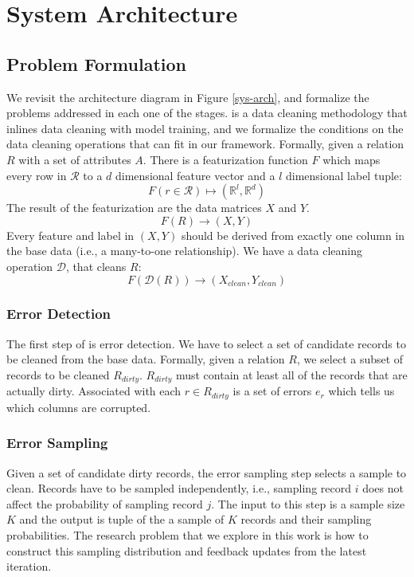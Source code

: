\section{System Architecture}\label{arch}

\subsection{Problem Formulation}
We revisit the architecture diagram in Figure \ref{sys-arch}, and formalize
the problems addressed in each one of the stages.
\sys is a data cleaning methodology that inlines data cleaning with model training, and we formalize the conditions on the data cleaning operations that can fit in our framework.
Formally, given a relation $R$ with a set of attributes $A$.
There is a featurization function $F$ which maps every row in $\mathcal{R}$ to a $d$ dimensional feature vector and a $l$ dimensional label tuple: 
\[F(r \in \mathcal{R}) \mapsto (\mathbb{R}^l, \mathbb{R}^d)\]
The result of the featurization are the data matrices $X$ and $Y$.
\[
F(R)\rightarrow (X,Y)
\]
Every feature and label in $(X,Y)$ should be derived from exactly one column in the base data (i.e., a many-to-one relationship).
We have a data cleaning operation $\mathcal{D}$, that cleans $R$:
\[
F(\mathcal{D}(R))\rightarrow (X_{clean},Y_{clean})
\]

\subsubsection{Error Detection}
The first step of \sys is error detection.
We have to select a set of candidate records to be cleaned from the base data.
Formally, given a relation $R$, we select a subset of records to be cleaned $R_{dirty}$.
$R_{dirty}$ must contain at least all of the records that are actually dirty.
Associated with each $r \in R_{dirty}$ is a set of errors $e_r$ which tells us which columns are corrupted.

\subsubsection{Error Sampling}
Given a set of candidate dirty records, the error sampling step selects a sample to clean.
Records have to be sampled independently, i.e., sampling record $i$ does not affect the probability of sampling record $j$.
The input to this step is a sample size $K$ and the output is tuple of the a sample of $K$ records and their sampling probabilities.
The research problem that we explore in this work is how to construct this sampling distribution and feedback updates from the latest iteration.

